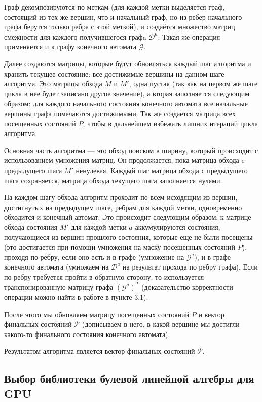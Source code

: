Граф декомпозируются по меткам (для каждой метки выделяется граф, состоящий из тех же вершин, что и начальный граф, но из ребер начального графа берутся только ребра с этой меткой), и создаётся множество матриц смежности для каждого получившегося графa $\mathcal{D}^a$. Такая же операция применяется и к графу конечного автомата $\mathcal{G}$.

Далее создаются матрицы, которые будут обновляться каждый шаг алгоритма и хранить текущее состояние: все достижимые вершины на данном шаге алгоритма. Это матрицы обхода $M$ и $M'$, одна пустая (так как на первом же шаге цикла в нее будет записано другое значение), а вторая заполняется следующим образом: для каждого начального состояния конечного автомата все начальные вершины графа помечаются достижимыми.
Так же создается матрица всех посещенных состояний $P$, чтобы в дальнейшем избежать лишних итераций цикла алгоритма.

Основная часть алгоритма --- это обход поиском в ширину, который происходит с использованием умножения матриц. Он продолжается, пока матрица обхода c предыдущего шага $M'$ ненулевая. Каждый шаг матрица обхода с предыдущего шага сохраняется, матрица обхода текущего шага заполняется нулями.

На каждом шагу обхода алгоритм проходит по всем исходящим из вершин, достигнутых на предыдущем шаге, ребрам для каждой метки, одновременно обходится и конечный автомат. Это происходит следующим образом: к матрице обхода состояния $M'$ для каждой метки $a$ аккумулируются состояния, получающиеся из вершин прошлого состояния, которые еще не были посещены (это достигается при помощи умножения на маску посещенных состояний $P$), проходя по ребру, если оно есть и в графе (умножение на $\mathcal{G}^a$), и в графе конечного автомата (умножаем на $\mathcal{D}^a$ на результат прохода по ребру графа). Если по ребру требуется пройти в обратную сторону, то используется транспонированную матрицу графа $(\mathcal{G}^a)^T$ (доказательство корректности операции можно найти в работе в пункте 3.1). 

После этого мы обновляем матрицу посещенных состояний $P$ и вектор финальных состояний $\mathcal{P}$ (дописываем в него, в какой вершине мы достигли какого-то финального состояния конечного автомата).  

Результатом алгоритма является вектор финальных состояний $\mathcal{P}$.

\subsection{Выбор библиотеки булевой линейной алгебры для GPU}

